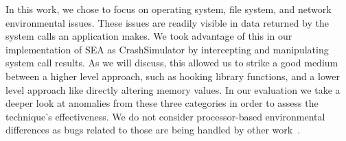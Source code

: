 In this work, we chose to focus on operating system,
file system, and network
environmental issues.
These issues are
readily visible in data returned
by the system calls
an application makes.
We took advantage of this in our implementation of SEA as CrashSimulator by
intercepting and manipulating system call results.
As we will discuss, this allowed us to strike a good medium between a
higher level approach, such as hooking library functions, and a lower level
approach like directly altering memory values.
In our evaluation we take a deeper look at anomalies from
these three categories in order to assess the technique's effectiveness.
We do not consider processor-based environmental differences as bugs related to those are being handled by other
work~\cite{Alglave:2018:FSC:3173162.3177156}.

